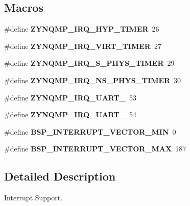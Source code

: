 \subsection*{Macros}
\begin{DoxyCompactItemize}
\item 
\mbox{\label{group__zynqmp__interrupt_ga019c321866257bc7080509cc804dcb17}} 
\#define {\bfseries Z\+Y\+N\+Q\+M\+P\+\_\+\+I\+R\+Q\+\_\+\+H\+Y\+P\+\_\+\+T\+I\+M\+ER}~26
\item 
\mbox{\label{group__zynqmp__interrupt_gae0aca67d94c1546ad53df8fcf0949485}} 
\#define {\bfseries Z\+Y\+N\+Q\+M\+P\+\_\+\+I\+R\+Q\+\_\+\+V\+I\+R\+T\+\_\+\+T\+I\+M\+ER}~27
\item 
\mbox{\label{group__zynqmp__interrupt_gafd9fbecd63275442d622af5318918bd0}} 
\#define {\bfseries Z\+Y\+N\+Q\+M\+P\+\_\+\+I\+R\+Q\+\_\+\+S\+\_\+\+P\+H\+Y\+S\+\_\+\+T\+I\+M\+ER}~29
\item 
\mbox{\label{group__zynqmp__interrupt_ga7d524123417a3448b4064ac018b84007}} 
\#define {\bfseries Z\+Y\+N\+Q\+M\+P\+\_\+\+I\+R\+Q\+\_\+\+N\+S\+\_\+\+P\+H\+Y\+S\+\_\+\+T\+I\+M\+ER}~30
\item 
\mbox{\label{group__zynqmp__interrupt_ga26ca5db1aee74b4344cda987a5c248e4}} 
\#define {\bfseries Z\+Y\+N\+Q\+M\+P\+\_\+\+I\+R\+Q\+\_\+\+U\+A\+R\+T\+\_}~53
\item 
\mbox{\label{group__zynqmp__interrupt_ga6be5d8e29b03f2b2d49b568a24827f68}} 
\#define {\bfseries Z\+Y\+N\+Q\+M\+P\+\_\+\+I\+R\+Q\+\_\+\+U\+A\+R\+T\+\_}~54
\item 
\mbox{\label{group__zynqmp__interrupt_ga64cbb02dfea4d6923abccaa0087d2a0d}} 
\#define {\bfseries B\+S\+P\+\_\+\+I\+N\+T\+E\+R\+R\+U\+P\+T\+\_\+\+V\+E\+C\+T\+O\+R\+\_\+\+M\+IN}~0
\item 
\mbox{\label{group__zynqmp__interrupt_gae4a2cdda5816a4c83c2fac0a49880c6e}} 
\#define {\bfseries B\+S\+P\+\_\+\+I\+N\+T\+E\+R\+R\+U\+P\+T\+\_\+\+V\+E\+C\+T\+O\+R\+\_\+\+M\+AX}~187
\end{DoxyCompactItemize}


\subsection{Detailed Description}
Interrupt Support. 

